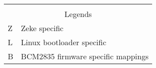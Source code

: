 \begin{table}
\begin{tabular}{l|l}
\multicolumn{2}{c}{} \\
\multicolumn{2}{c}{Legends} \\
\hline
Z & Zeke specific \\
L & Linux bootloader specific \\
B & BCM2835 firmware specific mappings
\end{tabular}
\end{table}






